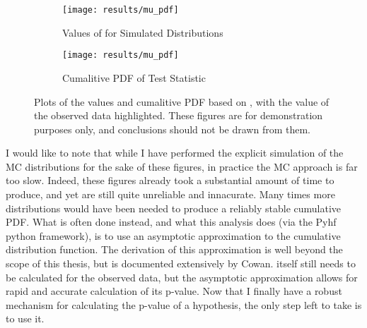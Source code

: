     \begin{figure} %
        \centering
        \begin{subfigure}{0.48\textwidth} 
            \texttt{[image: results/mu\_pdf]}
            \caption{Values of \qtil for Simulated Distributions}
            \label{fig:qtil:pdf}
        \end{subfigure}
        \begin{subfigure}{0.48\textwidth}
            \texttt{[image: results/mu\_pdf]}
            \caption{Cumalitive PDF of \qtil Test Statistic}
            \label{fig:qtil:Cpdf}
        \end{subfigure}
        \caption{
            Plots of the values and cumalitive PDF based on \qtil,
                with the \qtil value of the observed data highlighted.
            These figures are for demonstration purposes only,
                and conclusions should not be drawn from them.
        }
    \end{figure}

    I would like to note that while I have performed the explicit simulation of the MC distributions for the sake of these figures,
        in practice the MC approach is far too slow.
    Indeed, these figures already took a substantial amount of time to produce, and yet are still quite unreliable and innacurate.
    Many times more distributions would have been needed to produce a reliably stable cumulative PDF.
    What is often done instead, and what this analysis does (via the Pyhf python framework),
        is to use an asymptotic approximation to the \qtil cumulative distribution function.
    The derivation of this approximation is well beyond the scope of this thesis,
        but is documented extensively by Cowan\cite{asymptotic_formulae_for_likelihood}.
    \qtil itself still needs to be calculated for the observed data,
        but the asymptotic approximation allows for rapid and accurate calculation of its p-value.
    Now that I finally have a robust mechanism for calculating the p-value of a hypothesis,
        the only step left to take is to use it.

\FloatBarrier

